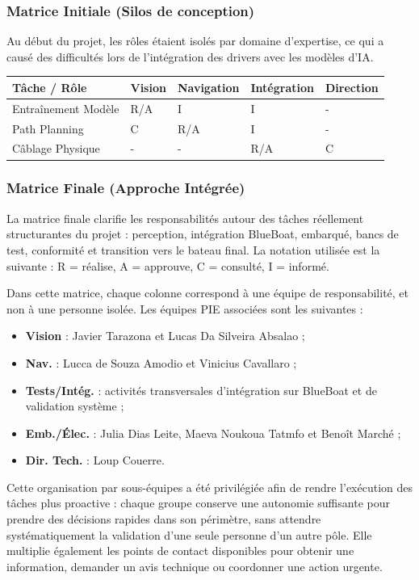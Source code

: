 \documentclass[11pt,letterpaper]{article}
\begin{document}
\subsubsection{Matrice Initiale (Silos de conception)}
Au début du projet, les rôles étaient isolés par domaine d'expertise, ce qui a causé des difficultés lors de l'intégration des drivers avec les modèles d'IA.
\begin{center}
\small
\begin{tabularx}{\textwidth}{lXXXX}
\toprule
\textbf{Tâche / Rôle} & Vision & Navigation & Intégration & Direction \\
\midrule
Entraînement Modèle & R/A & I & I & - \\
Path Planning & C & R/A & I & - \\
Câblage Physique & - & - & R/A & C \\
\bottomrule
\end{tabularx}
\end{center}

\subsubsection{Matrice Finale (Approche Intégrée)}
La matrice finale clarifie les responsabilités autour des tâches réellement structurantes du projet : perception, intégration BlueBoat, embarqué, bancs de test, conformité et transition vers le bateau final. La notation utilisée est la suivante : R = réalise, A = approuve, C = consulté, I = informé.

Dans cette matrice, chaque colonne correspond à une équipe de responsabilité, et non à une 
personne isolée. Les équipes PIE associées sont les suivantes : 

\begin{itemize}
    \item \textbf{Vision} : Javier Tarazona et Lucas Da Silveira Absalao ;
    \item \textbf{Nav.} : Lucca de Souza Amodio et Vinicius Cavallaro ;
    \item \textbf{Tests/Intég.} : activités transversales d'intégration sur BlueBoat et de validation système ;
    \item \textbf{Emb./Élec.} : Julia Dias Leite, Maeva Noukoua Tatmfo et Benoît Marché ;
    \item \textbf{Dir. Tech.} : Loup Couerre.
\end{itemize}

Cette organisation par sous-équipes a été privilégiée afin de rendre l'exécution des tâches plus proactive : chaque groupe conserve une autonomie suffisante pour prendre des décisions rapides dans son périmètre, sans attendre systématiquement la validation d'une seule personne d'un autre pôle. Elle multiplie également les points de contact disponibles pour obtenir une information, demander un avis technique ou coordonner une action urgente.
\end{document}
